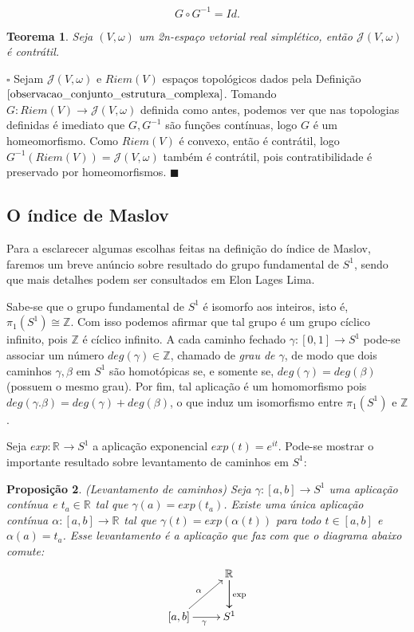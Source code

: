 \documentclass[12pt]{book}
\newtheorem{teorema}{Teorema}[section]
\newtheorem{proposicao}[teorema]{Proposição}
\newenvironment{prova}[1]{$\square$ #1}{\hfill$\blacksquare$}
\newcommand{\estruturacomplexapadrao}{\mathcal{J}(V, \omega)}
\newcommand{\produtosinternos}[1]{Riem(#1)}
\newcommand{\real}[1]{\mathbb{R}^{#1}}
\newcommand{\vermelho}[1]{{\color{red}#1}}
\begin{document}
	$$
	G\circ G^{-1} = Id.
	$$
	
	\begin{teorema}
		Seja $(V,\omega)$ um 2n-espaço vetorial real simplético, então $\estruturacomplexapadrao$ é contrátil.
	\end{teorema}
	\begin{prova}
		Sejam $\estruturacomplexapadrao$ e $\produtosinternos{V}$ espaços topológicos dados pela Definição $\ref{observacao_conjunto_estrutura_complexa}$. Tomando $G:\produtosinternos{V} \to \estruturacomplexapadrao$ definida como antes, \vermelho{podemos ver que nas topologias definidas é imediato que $G, G^{-1}$ são funções contínuas}, logo $G$ é um homeomorfismo. Como $\produtosinternos{V}$ é convexo, então é contrátil, logo $G^{-1}(\produtosinternos{V}) = \estruturacomplexapadrao$ também é contrátil, pois contratibilidade é preservado por homeomorfismos.
	\end{prova}
	
	\subsection{O índice de Maslov}
	Para a esclarecer algumas escolhas feitas na definição do índice de Maslov, faremos um breve anúncio sobre resultado do grupo fundamental de $S^{1}$, sendo que mais detalhes podem ser consultados em \vermelho{Elon Lages Lima}.
	
	Sabe-se que o grupo fundamental de $S^{1}$ é isomorfo aos inteiros, isto é, $\pi_{1}(S^{1}) \cong \mathbb{Z}$. Com isso podemos afirmar que tal grupo é um grupo cíclico infinito, pois $\mathbb{Z}$ é cíclico infinito. A cada caminho fechado $\gamma:[0,1] \to S^{1}$ pode-se associar um número $deg(\gamma) \in \mathbb{Z}$, chamado de \textit{grau de $\gamma$}, de modo que dois caminhos $\gamma, \beta$ em $S^{1}$ são homotópicas se, e somente se, $deg(\gamma) = deg(\beta)$ (possuem o mesmo grau). Por fim, tal aplicação é um homomorfismo pois $deg(\gamma.\beta)=deg(\gamma)+deg(\beta)$, o que induz um isomorfismo entre $\pi_{1}(S^{1})$ e $\mathbb{Z}$.
	
	Seja $exp:\real{} \to S^{1}$ a aplicação exponencial $exp(t) = e^{it}$. Pode-se mostrar o importante resultado sobre levantamento de caminhos em $S^{1}$:
	
	\begin{proposicao}\label{proposicao_levantamento_curvas}
		(Levantamento de caminhos) Seja $\gamma:[a,b] \to S^{1}$ uma aplicação contínua e $t_{a}\in \real{}$ tal que $\gamma(a) = exp(t_{a})$. Existe uma única aplicação contínua $\alpha:[a,b] \to \real{}$ tal que $\gamma(t) = exp(\alpha(t))$ para todo $t\in [a,b]$ e $\alpha(a) = t_{a}$. Esse levantamento é a aplicação que faz com que o diagrama abaixo comute:
		$$
		\xymatrix{
			& \real{}\ar[d]\ar[d]^{\text{exp}}
			\\
			[a,b]\ar[ur]^{\alpha} \ar[r]_{\gamma} & S^{1}
		}
		$$
	\end{proposicao}
	
\end{document}
